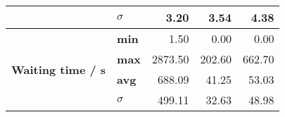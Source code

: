 \begin{table}[]
\begin{tabular}{llrrr}
                                               & \textbf{$ \sigma $} & 3.20                                                                                                                                              & 3.54                                                                                                                                              & 4.38                                                                                                                                            \\ \hline
\multirow{4}{*}{\textbf{Waiting time / s}}     & \textbf{min}        & 1.50                                                                                                                                              & 0.00                                                                                                                                              & 0.00                                                                                                                                            \\
                                               & \textbf{max}        & 2873.50                                                                                                                                           & 202.60                                                                                                                                            & 662.70                                                                                                                                          \\
                                               & \textbf{avg}        & 688.09                                                                                                                                            & 41.25                                                                                                                                             & 53.03                                                                                                                                           \\
                                               & \textbf{$ \sigma $} & 499.11                                                                                                                                            & 32.63                                                                                                                                             & 48.98                                                                                                                                           \\ \hline

\end{tabular}
\end{table}
